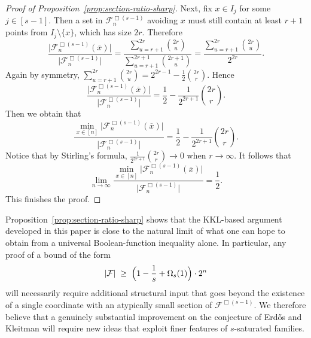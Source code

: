\documentclass[11pt]{article}
\theoremstyle{definition}
\begin{document}
\begin{proof}[Proof of Proposition~\ref{prop:section-ratio-sharp}]
Next, fix \(x\in I_{j}\) for some \(j\in [s-1]\). Then a set in \(\mathcal{F}_{n}^{\Box(s-1)}\) avoiding \(x\) must still contain at least \(r+1\) points from \(I_j\setminus\{x\}\), which has size \(2r\). Therefore
\[
\frac{\bigl|\mathcal{F}_{n}^{\Box(s-1)}(\overline{x})\bigr|}
     {\bigl|\mathcal{F}_{n}^{\Box(s-1)}\bigr|}
=
\frac{\sum_{u=r+1}^{2r}\binom{2r}{u}}
     {\sum_{u=r+1}^{2r+1}\binom{2r+1}{u}}
=
\frac{\sum_{u=r+1}^{2r}\binom{2r}{u}}{2^{2r}}.
\]
Again by symmetry,
\(
\sum_{u=r+1}^{2r}\binom{2r}{u}
=
2^{2r-1}-\frac12\binom{2r}{r}.
\)
Hence
\[
\frac{\bigl|\mathcal{F}_{n}^{\Box(s-1)}(\overline{x})\bigr|}
     {\bigl|\mathcal{F}_{n}^{\Box(s-1)}\bigr|}
=
\frac12-\frac{1}{2^{2r+1}}\binom{2r}{r}.
\]
Then we obtain that
\[
\frac{\min_{x\in [n]} \bigl|\mathcal{F}_{n}^{\Box(s-1)}(\overline{x})\bigr|}
     {\bigl|\mathcal{F}_{n}^{\Box(s-1)}\bigr|}
=
\frac12-\frac{1}{2^{2r+1}}\binom{2r}{r}.
\]
Notice that by Stirling's formula,
\(
\frac{1}{2^{2r+1}}\binom{2r}{r}\to 0
\)
when \(r\rightarrow\infty.\)
It follows that
\[
\lim_{n\to\infty}
\frac{\min_{x\in [n]} \bigl|\mathcal{F}_{n}^{\Box(s-1)}(\overline{x})\bigr|}
     {\bigl|\mathcal{F}_{n}^{\Box(s-1)}\bigr|}
=
\frac12.
\]
This finishes the proof.
\end{proof}
Proposition~\ref{prop:section-ratio-sharp} shows that the KKL-based argument developed in this paper is close to the natural limit of what one can hope to obtain from a universal Boolean-function inequality alone. In particular, any proof of a bound of the form
\[
|\mathcal{F}|
\;\ge\;
\Bigl(1-\frac{1}{s}+\Omega_s(1)\Bigr)\cdot 2^{n}
\]
will necessarily require additional structural input that goes beyond the existence of a single coordinate with an atypically small section of \(\mathcal{F}^{\Box(s-1)}\). We therefore believe that a genuinely substantial improvement on the conjecture of Erd\H{o}s and Kleitman will require new ideas that exploit finer features of \(s\)-saturated families.





\end{document}
